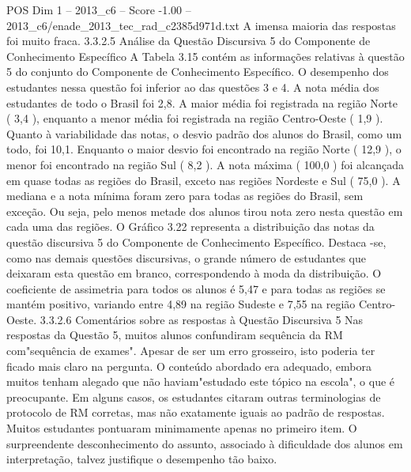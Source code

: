 \begin{textsample}{POS Dim 1 – 2013\_c6 – Score -1.00 – 2013\_c6/enade\_2013\_tec\_rad\_c2385d971d.txt}
A imensa maioria das respostas foi muito fraca. 3.3.2.5 Análise da Questão Discursiva 5 do Componente de Conhecimento Específico A Tabela 3.15 contém as informações relativas à questão 5 do conjunto do Componente de Conhecimento Específico.
O desempenho dos estudantes nessa questão foi inferior ao das questões 3 e 4.
A nota média dos estudantes de todo o Brasil foi 2,8.
A maior média foi registrada na região Norte ( 3,4 ), enquanto a menor média foi registrada na região Centro-Oeste ( 1,9 ).
Quanto à variabilidade das notas, o desvio padrão dos alunos do Brasil, como um todo, foi 10,1.
Enquanto o maior desvio foi encontrado na região Norte ( 12,9 ), o menor foi encontrado na região Sul ( 8,2 ).
A nota máxima ( 100,0 ) foi alcançada em quase todas as regiões do Brasil, exceto nas regiões Nordeste e Sul ( 75,0 ).
A mediana e a nota mínima foram zero para todas as regiões do Brasil, sem exceção.
Ou seja, pelo menos metade dos alunos tirou nota zero nesta questão em cada uma das regiões.
O Gráfico 3.22 representa a distribuição das notas da questão discursiva 5 do Componente de Conhecimento Específico.
Destaca -se, como nas demais questões discursivas, o grande número de estudantes que deixaram esta questão em branco, correspondendo à moda da distribuição.
O coeficiente de assimetria para todos os alunos é 5,47 e para todas as regiões se mantém positivo, variando entre 4,89 na região Sudeste e 7,55 na região Centro-Oeste. 3.3.2.6 Comentários sobre as respostas à Questão Discursiva 5 Nas respostas da Questão 5, muitos alunos confundiram sequência da RM com"sequência de exames".
Apesar de ser um erro grosseiro, isto poderia ter ficado mais claro na pergunta.
O conteúdo abordado era adequado, embora muitos tenham alegado que não haviam"estudado este tópico na escola", o que é preocupante.
Em alguns casos, os estudantes citaram outras terminologias de protocolo de RM corretas, mas não exatamente iguais ao padrão de respostas.
Muitos estudantes pontuaram minimamente apenas no primeiro item.
O surpreendente desconhecimento do assunto, associado à dificuldade dos alunos em interpretação, talvez justifique o desempenho tão baixo.

\end{textsample}

